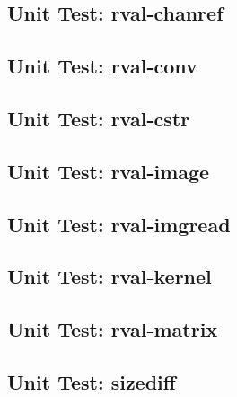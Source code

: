 \subsection*{Unit Test: rval-chanref}

 \clearpage
\subsection*{Unit Test: rval-conv}

 \clearpage
\subsection*{Unit Test: rval-cstr}

 \clearpage
\subsection*{Unit Test: rval-image}

 \clearpage
\subsection*{Unit Test: rval-imgread}

 \clearpage
\subsection*{Unit Test: rval-kernel}

 \clearpage
\subsection*{Unit Test: rval-matrix}

 \clearpage
\subsection*{Unit Test: sizediff}

 \clearpage
